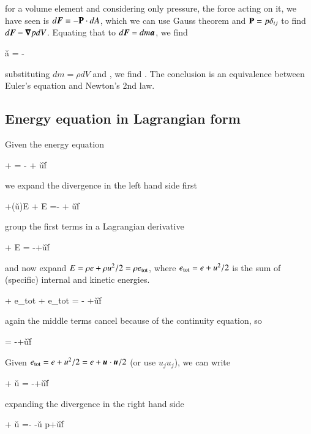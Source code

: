 \noindent for a volume element and considering only pressure, the
force acting on it, we have seen is $d{\boldsymbol{F}}=-\boldsymbol{\mathrm{P}}\cdot dA$, which
we can use Gauss theorem and $\boldsymbol{\mathrm{P}}=p\delta_{ij}$ to find
$d{\boldsymbol{F}}-{\boldsymbol{\nabla}}{p}dV$. Equating that to  $d{\boldsymbol{F}}=dm {\boldsymbol{a}}$, we find 

\beq
\v{a} = -
\eeq

\noindent substituting $dm=\rho dV$ and , we find
. The conclusion is an
equivalence between Euler's equation and Newton's 2nd law.

\subsection{Energy equation in Lagrangian form}

Given the energy equation 

\beq
{} +  = - +
\rho\v{u}\cdot \v{f}
\eeq

\noindent we expand the divergence in the left hand side first 

\beq
{} +(\v{u}\cdot\grad)E + E  =- + \rho\v{u}\cdot \v{f}
\eeq

\noindent group the first terms in a Lagrangian derivative

\beq
{} + E  = -+\rho\v{u}\cdot \v{f}
\eeq

\noindent and now expand $E=\rho e + \rho u^2/2  = \rho e_{\rm tot}$, where $ e_{\rm
  tot}=e + u^2/2$ is the sum of (specific) internal and kinetic
energies. 

\beq
\rho{} + e_{\rm tot} + e_{\rm tot}\rho{}  = - +\rho\v{u}\cdot \v{f}
\eeq

\noindent again the middle terms cancel because of the continuity equation, so 

\beq
{}  = -+\v{u}\cdot \v{f}
\eeq

Given $ e_{\rm  tot}=e + u^2/2 = e + {\boldsymbol{u}}\cdot{\boldsymbol{u}}/2$ (or use $u_ju_j$), we can write 

\beq
{} + \v{u} \cdot{} = -+\rho\v{u}\cdot \v{f}
\eeq

\noindent expanding the divergence in the right hand side 

\beq
{} + \v{u} \cdot{} =- -\v{u} \cdot \grad p+\rho\v{u}\cdot \v{f}
\eeq

